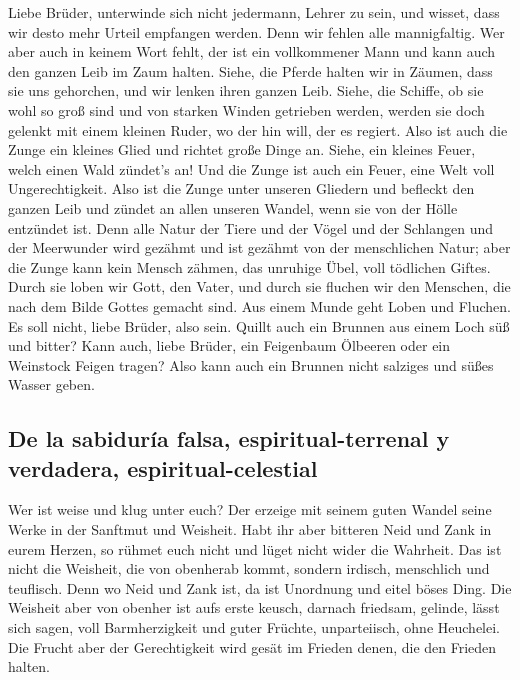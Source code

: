  Liebe Brüder, unterwinde sich nicht jedermann, Lehrer zu
sein, und wisset, dass wir desto mehr Urteil empfangen werden.
 Denn wir fehlen alle mannigfaltig. Wer aber auch in
keinem Wort fehlt, der ist ein vollkommener Mann und kann auch den
ganzen Leib im Zaum halten.  Siehe, die Pferde halten wir
in Zäumen, dass sie uns gehorchen, und wir lenken ihren ganzen Leib.
 Siehe, die Schiffe, ob sie wohl so groß sind und von
starken Winden getrieben werden, werden sie doch gelenkt mit einem
kleinen Ruder, wo der hin will, der es regiert.  Also ist
auch die Zunge ein kleines Glied und richtet große Dinge an. Siehe, ein
kleines Feuer, welch einen Wald zündet's an!  Und die
Zunge ist auch ein Feuer, eine Welt voll Ungerechtigkeit. Also ist die
Zunge unter unseren Gliedern und befleckt den ganzen Leib und zündet an
allen unseren Wandel, wenn sie von der Hölle entzündet ist.
 Denn alle Natur der Tiere und der Vögel und der Schlangen
und der Meerwunder wird gezähmt und ist gezähmt von der menschlichen
Natur;  aber die Zunge kann kein Mensch zähmen, das
unruhige Übel, voll tödlichen Giftes.  Durch sie loben wir
Gott, den Vater, und durch sie fluchen wir den Menschen, die nach dem
Bilde Gottes gemacht sind.  Aus einem Munde geht Loben
und Fluchen. Es soll nicht, liebe Brüder, also sein. 
Quillt auch ein Brunnen aus einem Loch süß und bitter? 
Kann auch, liebe Brüder, ein Feigenbaum Ölbeeren oder ein Weinstock
Feigen tragen? Also kann auch ein Brunnen nicht salziges und süßes
Wasser geben.

\hypertarget{de-la-sabiduruxeda-falsa-espiritual-terrenal-y-verdadera-espiritual-celestial}{%
\subsection{De la sabiduría falsa, espiritual-terrenal y verdadera,
espiritual-celestial}\label{de-la-sabiduruxeda-falsa-espiritual-terrenal-y-verdadera-espiritual-celestial}}

 Wer ist weise und klug unter euch? Der erzeige mit
seinem guten Wandel seine Werke in der Sanftmut und Weisheit.
 Habt ihr aber bitteren Neid und Zank in eurem Herzen, so
rühmet euch nicht und lüget nicht wider die Wahrheit. 
Das ist nicht die Weisheit, die von obenherab kommt, sondern irdisch,
menschlich und teuflisch.  Denn wo Neid und Zank ist, da
ist Unordnung und eitel böses Ding.  Die Weisheit aber
von obenher ist aufs erste keusch, darnach friedsam, gelinde, lässt sich
sagen, voll Barmherzigkeit und guter Früchte, unparteiisch, ohne
Heuchelei.  Die Frucht aber der Gerechtigkeit wird gesät
im Frieden denen, die den Frieden halten.

